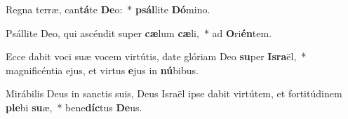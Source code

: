 \item Regna terræ, can\textbf{tá}te \textbf{De}o:~* \textbf{psál}lite \textbf{Dó}mino.
\item Psállite Deo, qui ascéndit super \textbf{cæ}lum \textbf{cæ}li,~* ad \textbf{O}ri\textbf{én}tem.
\item Ecce dabit voci suæ vocem virtútis, date glóriam Deo \textbf{su}per \textbf{Is}\textbf{ra}ël,~* magnificéntia ejus, et virtus \textbf{e}jus in \textbf{nú}bibus.
\item Mirábilis Deus in sanctis suis, Deus Israël ipse dabit virtútem, et fortitúdinem \textbf{ple}bi \textbf{su}æ,~* bene\textbf{díc}tus \textbf{De}us.
